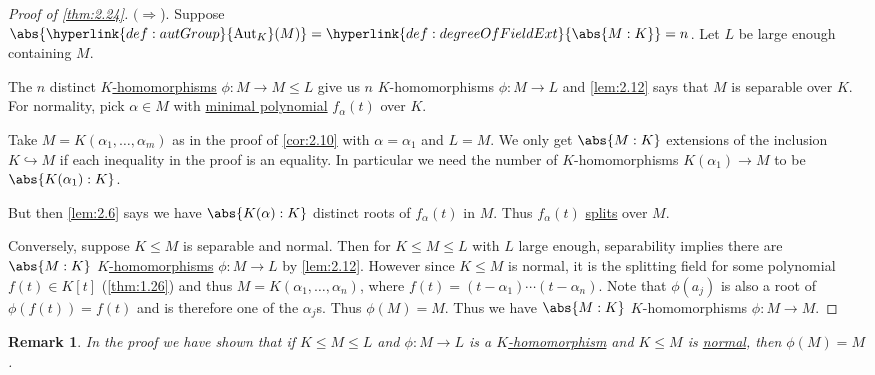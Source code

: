 \documentclass{article}
\DeclareMathOperator{\Aut}{Aut}
\newtheorem{nremark}[nthm]{Remark}
\begin{document}
\begin{proof}[Proof of \cref{thm:2.24}]
    $(\Rightarrow$). Suppose $\abs{\hyperlink{def:autGroup}{\Aut_K}(M)} = \hyperlink{def:degreeOfFieldExt}{\abs{M:K}} = n$.
    Let $L$ be large enough containing $M$.

    The $n$ distinct \hyperlink{def:homo}{$K$-homomorphisms} $\phi: M \to M \leq L$ give us $n$ $K$-homomorphisms $\phi:M \to L$ and \cref{lem:2.12} says that $M$ is separable over $K$.
    For normality, pick $\alpha \in M$ with \hyperlink{def:minimalPoly}{minimal polynomial} $f_\alpha(t)$ over $K$.

    Take $M = K(\alpha_1, \dotsc, \alpha_m)$ as in the proof of \cref{cor:2.10} with $\alpha = \alpha_1$ and $L = M$.
    We only get $\abs{M:K}$ extensions of the inclusion $K \hookrightarrow M$ if each inequality in the proof is an equality.
    In particular we need the number of $K$-homomorphisms $K(\alpha_1) \to M$ to be $\abs{K(\alpha_1):K}$.

    But then \cref{lem:2.6} says we have $\abs{K(\alpha):K}$ distinct roots of $f_\alpha(t)$ in $M$.
    Thus $f_\alpha(t)$ \hyperlink{def:splitting}{splits} over $M$.

    Conversely, suppose $K \leq M$ is separable and normal.
    Then for $K \leq M \leq L$ with $L$ large enough, separability implies there are $\abs{M:K}$ \hyperlink{def:homo}{$K$-homomorphisms} $\phi:M \to L$ by \cref{lem:2.12}.
    However since $K \leq M$ is normal, it is the splitting field for some polynomial $f(t) \in K[t]$ (\cref{thm:1.26}) and thus $M = K(\alpha_1, \dotsc, \alpha_n)$, where $f(t) = (t - \alpha_1) \dotsm (t - \alpha_n)$.
    Note that $\phi(a_j)$ is also a root of $\phi(f(t)) = f(t)$ and is therefore one of the $\alpha_j$s.
    Thus $\phi(M) = M$. Thus we have $\abs{M:K}$ $K$-homomorphisms $\phi:M \to M$.
\end{proof}

\begin{nremark}\label{rem:2.27}
    In the proof we have shown that if $K \leq M \leq L$ and $\phi:M \to L$ is a \hyperlink{def:homo}{$K$-homomorphism} and $K \leq M$ is \hyperlink{def:normal}{normal}, then $\phi(M) = M$.
\end{nremark}
\end{document}
